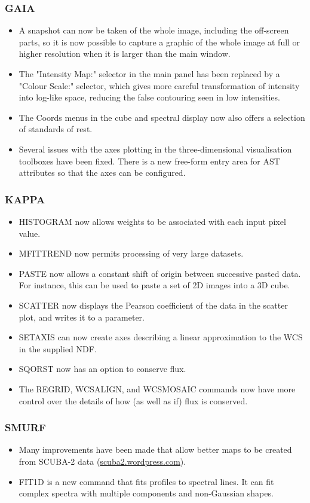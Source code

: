 \subsubsection{GAIA}
\begin{itemize}
\item A snapshot can now be taken of the whole image, including the off-screen parts, so it is now possible to capture a graphic of the whole image at full or higher resolution when it is larger than the main window.
\item The "Intensity Map:" selector in the main panel has been replaced by a "Colour Scale:" selector, which gives more careful transformation of intensity into log-like space, reducing the false contouring seen in low intensities.
\item The Coords menus in the cube and spectral display now also offers a selection of standards of rest.
\item Several issues with the axes plotting in the three-dimensional visualisation toolboxes have been fixed. There is a new free-form entry area for AST attributes so that the axes can be configured.
\end{itemize}

\subsubsection{KAPPA}
\begin{itemize}
\item HISTOGRAM now allows weights to be associated with each input pixel value.
\item MFITTREND now permits processing of very large datasets.
\item PASTE now allows a constant shift of origin between successive pasted data. For instance, this can be used to paste a set of 2D images into a 3D cube.
\item SCATTER now displays the Pearson coefficient of the data in the scatter plot, and writes it to a parameter.
\item SETAXIS can now create axes describing a linear approximation to the WCS in the supplied NDF.
\item SQORST now has an option to conserve flux.
\item The REGRID, WCSALIGN, and WCSMOSAIC commands now have more control over the details of how (as well as if) flux is conserved.
\end{itemize}

\subsubsection{SMURF}
\begin{itemize}
\item Many improvements have been made that allow better maps to be created from SCUBA-2 data (\url{scuba2.wordpress.com}).
\item FIT1D is a new command that fits profiles to spectral lines.  It can fit complex spectra with multiple components and non-Gaussian shapes.
\end{itemize}


